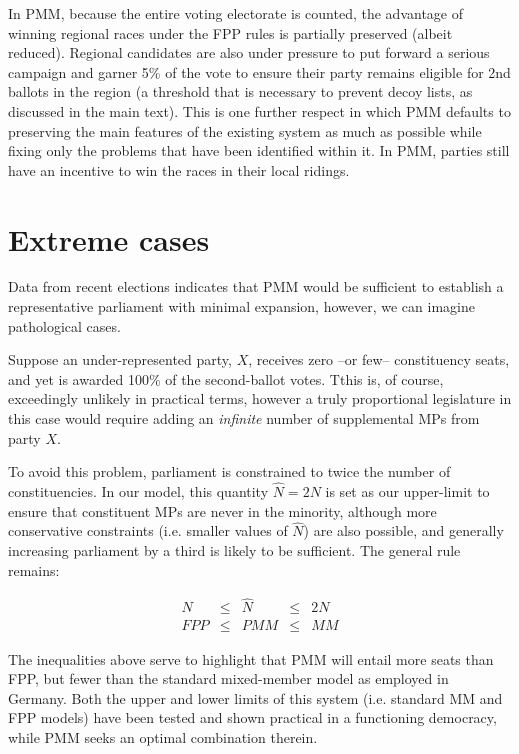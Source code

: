 \documentclass[DIV=calc, paper=a4, fontsize=11pt, twocolumn]{scrartcl}	 %
\begin{document}
In PMM, because the entire voting electorate is counted, the advantage of winning regional races under the FPP rules is partially preserved (albeit reduced). 
Regional candidates are also under pressure to put forward a serious campaign and garner 5\% of the vote to ensure their party remains eligible for 2nd ballots in the region (a threshold that is necessary to prevent decoy lists, as discussed in the main text). 
This is one further respect in which PMM defaults to preserving the main features of the existing system as much as possible while fixing only the problems that have been identified within it. 
In PMM, parties still have an incentive to win the races in their local ridings.

\section{Extreme cases}

Data from recent elections indicates that PMM would be sufficient to establish a representative parliament with minimal expansion, however, we can imagine pathological cases. 

Suppose an under-represented party, $X$, receives zero \---or few\--- constituency seats, and yet is awarded 100\% of the second-ballot votes.
Tthis is, of course, exceedingly unlikely in practical terms, however a truly proportional legislature in this case would require adding an \emph{infinite} number of supplemental MPs from party \textbf{$X$}.

To avoid this problem, parliament is constrained to twice the number of constituencies. In our model, this quantity $\hat N = 2 N$ is set as our upper-limit to ensure that constituent MPs are never in the minority, although more conservative constraints (i.e. smaller values of $\hat N$) are also possible, and generally increasing parliament by a third is likely to be sufficient. 
The general rule remains:

\begin{align}
\label{eq:Nlimits}
N &\le& \hat{N} &\le& 2N \\
FPP &\le& PMM &\le& MM
\end{align}

The inequalities above serve to highlight that PMM will entail more seats than FPP, but fewer than the standard mixed-member model as employed in Germany. 
Both the upper and lower limits of this system (i.e. standard MM and FPP models) have been tested and shown practical in a functioning democracy, while PMM seeks an optimal combination therein.
\end{document}
